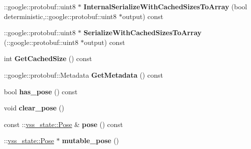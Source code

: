 \begin{DoxyCompactItemize}
\item 
\+::google\+::protobuf\+::uint8 $\ast$ {\bfseries Internal\+Serialize\+With\+Cached\+Sizes\+To\+Array} (bool deterministic,\+::google\+::protobuf\+::uint8 $\ast$output) const \hypertarget{classvss__state_1_1Robot__State_a4674117e4328f6b8378b2ea0c6f984a3}{}\label{classvss__state_1_1Robot__State_a4674117e4328f6b8378b2ea0c6f984a3}

\item 
\+::google\+::protobuf\+::uint8 $\ast$ {\bfseries Serialize\+With\+Cached\+Sizes\+To\+Array} (\+::google\+::protobuf\+::uint8 $\ast$output) const \hypertarget{classvss__state_1_1Robot__State_aba509d6681cb9d6a01f2a0ecb65bb613}{}\label{classvss__state_1_1Robot__State_aba509d6681cb9d6a01f2a0ecb65bb613}

\item 
int {\bfseries Get\+Cached\+Size} () const \hypertarget{classvss__state_1_1Robot__State_ada89e91697c3773ab009c765b2884734}{}\label{classvss__state_1_1Robot__State_ada89e91697c3773ab009c765b2884734}

\item 
\+::google\+::protobuf\+::\+Metadata {\bfseries Get\+Metadata} () const \hypertarget{classvss__state_1_1Robot__State_afb2668f8b861828a30ac978ab416e900}{}\label{classvss__state_1_1Robot__State_afb2668f8b861828a30ac978ab416e900}

\item 
bool {\bfseries has\+\_\+pose} () const \hypertarget{classvss__state_1_1Robot__State_a16f5802d6a727b0c4c98472010c12460}{}\label{classvss__state_1_1Robot__State_a16f5802d6a727b0c4c98472010c12460}

\item 
void {\bfseries clear\+\_\+pose} ()\hypertarget{classvss__state_1_1Robot__State_a33d40f6cc351a111c3bae3e095566564}{}\label{classvss__state_1_1Robot__State_a33d40f6cc351a111c3bae3e095566564}

\item 
const \+::\hyperlink{classvss__state_1_1Pose}{vss\+\_\+state\+::\+Pose} \& {\bfseries pose} () const \hypertarget{classvss__state_1_1Robot__State_a0c7dee60f0d9b34d6708f7912e666e68}{}\label{classvss__state_1_1Robot__State_a0c7dee60f0d9b34d6708f7912e666e68}

\item 
\+::\hyperlink{classvss__state_1_1Pose}{vss\+\_\+state\+::\+Pose} $\ast$ {\bfseries mutable\+\_\+pose} ()\hypertarget{classvss__state_1_1Robot__State_a08d3b0444895130052a1805120013941}{}\label{classvss__state_1_1Robot__State_a08d3b0444895130052a1805120013941}


\end{DoxyCompactItemize}
